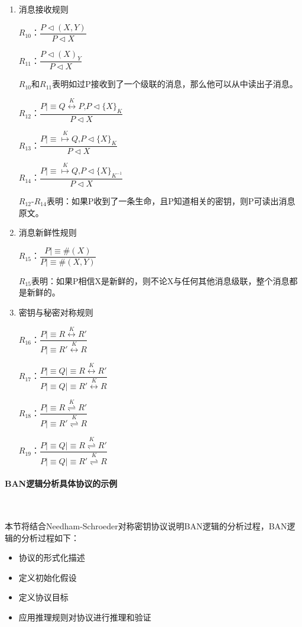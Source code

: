 \documentclass[cs4size,a4pape,UTF8]{ctexart}
\numberwithin{equation}{section}
\numberwithin{table}{section}
\numberwithin{figure}{section}
\begin{document}
\begin{enumerate}[(1)]
\item 消息接收规则

$R_{10}$：$\dfrac{P{\triangleleft}(X,Y)}{P{\triangleleft}X}$

$R_{11}$：$\dfrac{P{\triangleleft}(X)_Y}{P{\triangleleft}X}$

$R_{10}$和$R_{11}$表明如过P接收到了一个级联的消息，那么他可以从中读出子消息。

$R_{12}$：$\dfrac{P{\lvert\equiv}Q\stackrel{K}{\longleftrightarrow}P\textrm{,}P\triangleleft\{X\}_{K}}{P{\triangleleft}X}$

$R_{13}$：$\dfrac{P{\lvert\equiv}\stackrel{K}{\mapsto}Q\textrm{,} P\triangleleft\{X\}_{K}}{P{\triangleleft}X}$

$R_{14}$：$\dfrac{P{\lvert\equiv}\stackrel{K}{\mapsto}Q\textrm{,} P\triangleleft\{X\}_{K^{-1}}}{P{\triangleleft}X}$

$R_{12}$-$R_{14}$表明：如果P收到了一条生命，且P知道相关的密钥，则P可读出消息原文。

\item 消息新鲜性规则

$R_{15}$：$\dfrac{P{\lvert\equiv}\#(X)}{P{\lvert\equiv}\#(X,Y)}$

$R_{15}$表明：如果P相信X是新鲜的，则不论X与任何其他消息级联，整个消息都是新鲜的。

\item 密钥与秘密对称规则

$R_{16}$：$\dfrac{P{\lvert\equiv}R\stackrel{K}{\longleftrightarrow}R'}{P{\lvert\equiv}R'\stackrel{K}{\longleftrightarrow}R}$

$R_{17}$：$\dfrac{P{\lvert\equiv}Q{\lvert\equiv}R\stackrel{K}{\longleftrightarrow}R'}{P{\lvert\equiv}Q{\lvert\equiv}R'\stackrel{K}{\longleftrightarrow}R}$

$R_{18}$：$\dfrac{P{\lvert\equiv}R\stackrel{K}{\rightleftharpoons}R'}{P{\lvert\equiv}R'\stackrel{K}{\rightleftharpoons}R}$

$R_{19}$：$\dfrac{P{\lvert\equiv}Q{\lvert\equiv}R\stackrel{K}{\rightleftharpoons}R'}{P{\lvert\equiv}Q{\lvert\equiv}R'\stackrel{K}{\rightleftharpoons}R}$

\end{enumerate}

\paragraph{BAN逻辑分析具体协议的示例}\

本节将结合Needham-Schroeder对称密钥协议说明BAN逻辑的分析过程，BAN逻辑的分析过程如下： 
\begin{itemize}
\item 协议的形式化描述
\item 定义初始化假设
\item 定义协议目标
\item 应用推理规则对协议进行推理和验证
\end{itemize}
\end{document}
